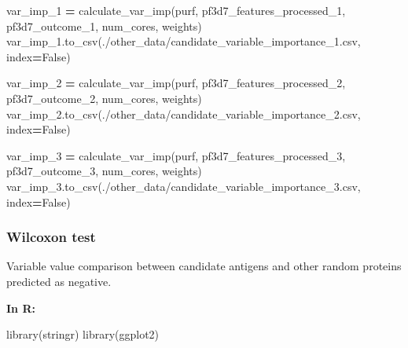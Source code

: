 \documentclass[
  11pt,
  oneside]{book}
\newenvironment{Shaded}{\begin{snugshade}}{\end{snugshade}}
\newcommand{\FunctionTok}[1]{\textcolor[rgb]{0.00,0.00,0.00}{#1}}
\newcommand{\NormalTok}[1]{#1}
\newcommand{\OperatorTok}[1]{\textcolor[rgb]{0.81,0.36,0.00}{\textbf{#1}}}
\newcommand{\StringTok}[1]{\textcolor[rgb]{0.31,0.60,0.02}{#1}}
\newcommand{\VariableTok}[1]{\textcolor[rgb]{0.00,0.00,0.00}{#1}}
\begin{document}
\begin{Shaded}
\begin{Highlighting}[]
\NormalTok{var\_imp\_1 }\OperatorTok{=}\NormalTok{ calculate\_var\_imp(purf, pf3d7\_features\_processed\_1, pf3d7\_outcome\_1, num\_cores, weights)}
\NormalTok{var\_imp\_1.to\_csv(}\StringTok{\textquotesingle{}./other\_data/candidate\_variable\_importance\_1.csv\textquotesingle{}}\NormalTok{, index}\OperatorTok{=}\VariableTok{False}\NormalTok{)}

\NormalTok{var\_imp\_2 }\OperatorTok{=}\NormalTok{ calculate\_var\_imp(purf, pf3d7\_features\_processed\_2, pf3d7\_outcome\_2, num\_cores, weights)}
\NormalTok{var\_imp\_2.to\_csv(}\StringTok{\textquotesingle{}./other\_data/candidate\_variable\_importance\_2.csv\textquotesingle{}}\NormalTok{, index}\OperatorTok{=}\VariableTok{False}\NormalTok{)}

\NormalTok{var\_imp\_3 }\OperatorTok{=}\NormalTok{ calculate\_var\_imp(purf, pf3d7\_features\_processed\_3, pf3d7\_outcome\_3, num\_cores, weights)}
\NormalTok{var\_imp\_3.to\_csv(}\StringTok{\textquotesingle{}./other\_data/candidate\_variable\_importance\_3.csv\textquotesingle{}}\NormalTok{, index}\OperatorTok{=}\VariableTok{False}\NormalTok{)}
\end{Highlighting}
\end{Shaded}

\hypertarget{wilcoxon-test-2}{%
\subsubsection{Wilcoxon test}\label{wilcoxon-test-2}}

Variable value comparison between candidate antigens and other random proteins predicted as negative.

\textbf{In R: }

\begin{Shaded}
\begin{Highlighting}[]
\FunctionTok{library}\NormalTok{(stringr)}
\FunctionTok{library}\NormalTok{(ggplot2)}
\end{Highlighting}
\end{Shaded}
\end{document}
